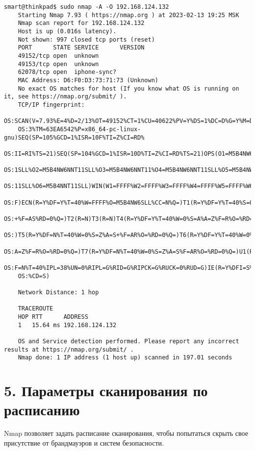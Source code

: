 \begin{Verbatim}[frame=single,breaklines=true,breakanywhere=true]
    smart@thinkpad$ sudo nmap -A -O 192.168.124.132
    Starting Nmap 7.93 ( https://nmap.org ) at 2023-02-13 19:25 MSK
    Nmap scan report for 192.168.124.132
    Host is up (0.016s latency).
    Not shown: 997 closed tcp ports (reset)
    PORT      STATE SERVICE      VERSION
    49152/tcp open  unknown
    49153/tcp open  unknown
    62078/tcp open  iphone-sync?
    MAC Address: D6:F0:D3:73:71:73 (Unknown)
    No exact OS matches for host (If you know what OS is running on it, see https://nmap.org/submit/ ).
    TCP/IP fingerprint:
    OS:SCAN(V=7.93%E=4%D=2/13%OT=49152%CT=1%CU=40622%PV=Y%DS=1%DC=D%G=Y%M=D6F0D
    OS:3%TM=63EA6542%P=x86_64-pc-linux-gnu)SEQ(SP=105%GCD=1%ISR=10F%TI=Z%CI=RD%
    OS:II=RI%TS=21)SEQ(SP=104%GCD=1%ISR=10D%TI=Z%CI=RD%TS=21)OPS(O1=M5B4NW6NNT1
    OS:1SLL%O2=M5B4NW6NNT11SLL%O3=M5B4NW6NNT11%O4=M5B4NW6NNT11SLL%O5=M5B4NW6NNT
    OS:11SLL%O6=M5B4NNT11SLL)WIN(W1=FFFF%W2=FFFF%W3=FFFF%W4=FFFF%W5=FFFF%W6=FFF
    OS:F)ECN(R=Y%DF=Y%T=40%W=FFFF%O=M5B4NW6SLL%CC=N%Q=)T1(R=Y%DF=Y%T=40%S=O%A=S
    OS:+%F=AS%RD=0%Q=)T2(R=N)T3(R=N)T4(R=Y%DF=Y%T=40%W=0%S=A%A=Z%F=R%O=%RD=0%Q=
    OS:)T5(R=Y%DF=N%T=40%W=0%S=Z%A=S+%F=AR%O=%RD=0%Q=)T6(R=Y%DF=Y%T=40%W=0%S=A%
    OS:A=Z%F=R%O=%RD=0%Q=)T7(R=Y%DF=N%T=40%W=0%S=Z%A=S%F=AR%O=%RD=0%Q=)U1(R=Y%D
    OS:F=N%T=40%IPL=38%UN=0%RIPL=G%RID=G%RIPCK=G%RUCK=0%RUD=G)IE(R=Y%DFI=S%T=40
    OS:%CD=S)

    Network Distance: 1 hop

    TRACEROUTE
    HOP RTT      ADDRESS
    1   15.64 ms 192.168.124.132

    OS and Service detection performed. Please report any incorrect results at https://nmap.org/submit/ .
    Nmap done: 1 IP address (1 host up) scanned in 197.01 seconds
\end{Verbatim}

\section*{5. Параметры сканирования по расписанию}

Nmap позволяет задать расписание сканирования, чтобы попытаться скрыть свое присутствие от брандмауэров и систем безопасности.

